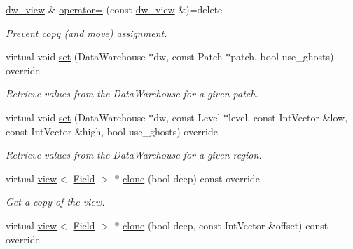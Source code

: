 \begin{DoxyCompactItemize}
\hyperlink{classUintah_1_1PhaseField_1_1detail_1_1dw__view}{dw\+\_\+view} \& \hyperlink{classUintah_1_1PhaseField_1_1detail_1_1dw__view_3_01ScalarField_3_01T_01_4_00_01VAR_00_01DIM_00_01GN_01_4_a5a6c4007981b58d024036706cc78cfb9}{operator=} (const \hyperlink{classUintah_1_1PhaseField_1_1detail_1_1dw__view}{dw\+\_\+view} \&)=delete
\begin{DoxyCompactList}\small\item\em Prevent copy (and move) assignment. \end{DoxyCompactList}\item 
virtual void \hyperlink{classUintah_1_1PhaseField_1_1detail_1_1dw__view_3_01ScalarField_3_01T_01_4_00_01VAR_00_01DIM_00_01GN_01_4_ac2693bea259a1182f011d27198a69ac6}{set} (Data\+Warehouse $\ast$dw, const Patch $\ast$patch, bool use\+\_\+ghosts) override
\begin{DoxyCompactList}\small\item\em Retrieve values from the Data\+Warehouse for a given patch. \end{DoxyCompactList}\item 
virtual void \hyperlink{classUintah_1_1PhaseField_1_1detail_1_1dw__view_3_01ScalarField_3_01T_01_4_00_01VAR_00_01DIM_00_01GN_01_4_a3f5275b8932cb8021465347a523282a1}{set} (Data\+Warehouse $\ast$dw, const Level $\ast$level, const Int\+Vector \&low, const Int\+Vector \&high, bool use\+\_\+ghosts) override
\begin{DoxyCompactList}\small\item\em Retrieve values from the Data\+Warehouse for a given region. \end{DoxyCompactList}\item 
virtual \hyperlink{classUintah_1_1PhaseField_1_1detail_1_1view}{view}$<$ \hyperlink{structUintah_1_1PhaseField_1_1ScalarField}{Field} $>$ $\ast$ \hyperlink{classUintah_1_1PhaseField_1_1detail_1_1dw__view_3_01ScalarField_3_01T_01_4_00_01VAR_00_01DIM_00_01GN_01_4_ae8805279b2994368f8a16bcfc4a5dad2}{clone} (bool deep) const override
\begin{DoxyCompactList}\small\item\em Get a copy of the view. \end{DoxyCompactList}\item 
virtual \hyperlink{classUintah_1_1PhaseField_1_1detail_1_1view}{view}$<$ \hyperlink{structUintah_1_1PhaseField_1_1ScalarField}{Field} $>$ $\ast$ \hyperlink{classUintah_1_1PhaseField_1_1detail_1_1dw__view_3_01ScalarField_3_01T_01_4_00_01VAR_00_01DIM_00_01GN_01_4_a47a3e1a15a57b331281c3c374e49bdc8}{clone} (bool deep, const Int\+Vector \&offset) const override

\end{DoxyCompactItemize}
